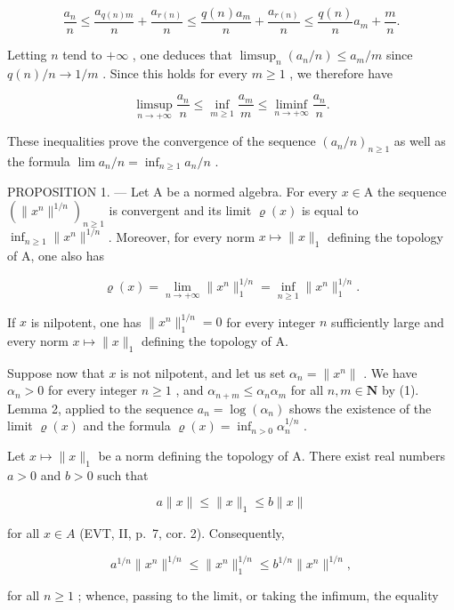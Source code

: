 \[
\frac {a _ {n}}{n} \leqslant \frac {a _ {q (n) m}}{n} + \frac {a _ {r (n)}}{n} \leqslant \frac {q (n) a _ {m}}{n} + \frac {a _ {r (n)}}{n} \leqslant \frac {q (n)}{n} a _ {m} + \frac {m}{n}.
\]

Letting \(n\) tend to \(+\infty\) , one deduces that \(\limsup_{n}(a_{n}/n) \leqslant a_{m}/m\) since \(q(n)/n \to 1/m\) . Since this holds for every \(m \geqslant 1\) , we therefore have

\[
\limsup _ {n \to + \infty} \frac {a _ {n}}{n} \leqslant \inf _ {m \geqslant 1} \frac {a _ {m}}{m} \leqslant \liminf _ {n \to + \infty} \frac {a _ {n}}{n}.
\]

These inequalities prove the convergence of the sequence \((a_{n}/n)_{n\geqslant1}\) as well as the formula \(\lim a_{n}/n = \inf_{n\geqslant1} a_{n}/n\) .

PROPOSITION 1. --- Let A be a normed algebra. For every \(x \in \mathrm{A}\) the sequence \((\|x^n\|^{1/n})_{n \geqslant 1}\) is convergent and its limit \(\varrho(x)\) is equal to \(\inf_{n \geqslant 1} \|x^n\|^{1/n}\) . Moreover, for every norm \(x \mapsto \|x\|_1\) defining the topology of A, one also has

\[
\varrho (x) = \lim _ {n \to + \infty} \| x ^ {n} \| _ {1} ^ {1 / n} = \inf _ {n \geqslant 1} \| x ^ {n} \| _ {1} ^ {1 / n}.
\]

If \(x\) is nilpotent, one has \(\| x^n\| _1^{1 / n} = 0\) for every integer \(n\) sufficiently large and every norm \(x\mapsto \| x\| _1\) defining the topology of A.

Suppose now that \(x\) is not nilpotent, and let us set \(\alpha_{n} = \| x^{n}\|\) . We have \(\alpha_{n} > 0\) for every integer \(n \geqslant 1\) , and \(\alpha_{n + m} \leqslant \alpha_{n}\alpha_{m}\) for all \(n, m \in \mathbf{N}\) by (1). Lemma 2, applied to the sequence \(a_n = \log(\alpha_n)\) shows the existence of the limit \(\varrho(x)\) and the formula \(\varrho(x) = \inf_{n > 0} \alpha_n^{1/n}\) .

Let \(x \mapsto \|x\|_1\) be a norm defining the topology of A. There exist real numbers \(a > 0\) and \(b > 0\) such that

\[
a \| x \| \leqslant \| x \| _ {1} \leqslant b \| x \|
\]

for all \(x \in A\) (EVT, II, p.~7, cor. 2). Consequently,

\[
a ^ {1 / n} \| x ^ {n} \| ^ {1 / n} \leqslant \| x ^ {n} \| _ {1} ^ {1 / n} \leqslant b ^ {1 / n} \| x ^ {n} \| ^ {1 / n},
\]

for all \(n \geqslant 1\) ; whence, passing to the limit, or taking the infimum, the equality

